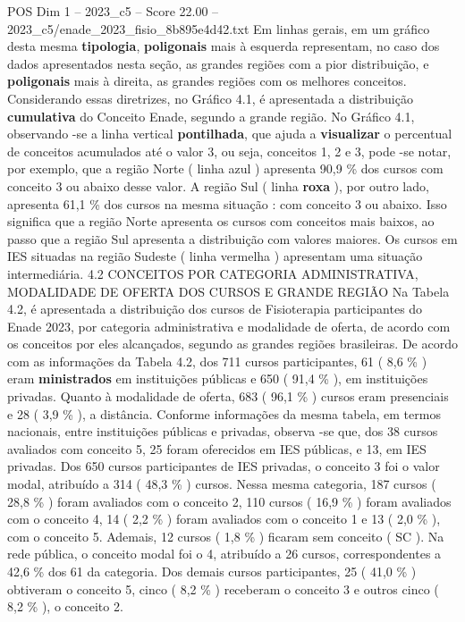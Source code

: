 \begin{textsample}{POS Dim 1 – 2023\_c5 – Score 22.00 – 2023\_c5/enade\_2023\_fisio\_8b895e4d42.txt}
Em linhas gerais, em um gráfico desta mesma \textbf{tipologia}, \textbf{poligonais} mais à esquerda representam, no caso dos dados apresentados nesta seção, as grandes regiões com a pior distribuição, e \textbf{poligonais} mais à direita, as grandes regiões com os melhores conceitos.
Considerando essas diretrizes, no Gráfico 4.1, é apresentada a distribuição \textbf{cumulativa} do Conceito Enade, segundo a grande região.
No Gráfico 4.1, observando -se a linha vertical \textbf{pontilhada}, que ajuda a \textbf{visualizar} o percentual de conceitos acumulados até o valor 3, ou seja, conceitos 1, 2 e 3, pode -se notar, por exemplo, que a região Norte ( linha azul ) apresenta 90,9 \% dos cursos com conceito 3 ou abaixo desse valor.
A região Sul ( linha \textbf{roxa} ), por outro lado, apresenta 61,1 \% dos cursos na mesma situação : com conceito 3 ou abaixo.
Isso significa que a região Norte apresenta os cursos com conceitos mais baixos, ao passo que a região Sul apresenta a distribuição com valores maiores.
Os cursos em IES situadas na região Sudeste ( linha vermelha ) apresentam uma situação intermediária. 4.2 CONCEITOS POR CATEGORIA ADMINISTRATIVA, MODALIDADE DE OFERTA DOS CURSOS E GRANDE REGIÃO Na Tabela 4.2, é apresentada a distribuição dos cursos de Fisioterapia participantes do Enade 2023, por categoria administrativa e modalidade de oferta, de acordo com os conceitos por eles alcançados, segundo as grandes regiões brasileiras.
De acordo com as informações da Tabela 4.2, dos 711 cursos participantes, 61 ( 8,6 \% ) eram \textbf{ministrados} em instituições públicas e 650 ( 91,4 \% ), em instituições privadas.
Quanto à modalidade de oferta, 683 ( 96,1 \% ) cursos eram presenciais e 28 ( 3,9 \% ), a distância.
Conforme informações da mesma tabela, em termos nacionais, entre instituições públicas e privadas, observa -se que, dos 38 cursos avaliados com conceito 5, 25 foram oferecidos em IES públicas, e 13, em IES privadas.
Dos 650 cursos participantes de IES privadas, o conceito 3 foi o valor modal, atribuído a 314 ( 48,3 \% ) cursos.
Nessa mesma categoria, 187 cursos ( 28,8 \% ) foram avaliados com o conceito 2, 110 cursos ( 16,9 \% ) foram avaliados com o conceito 4, 14 ( 2,2 \% ) foram avaliados com o conceito 1 e 13 ( 2,0 \% ), com o conceito 5.
Ademais, 12 cursos ( 1,8 \% ) ficaram sem conceito ( SC ).
Na rede pública, o conceito modal foi o 4, atribuído a 26 cursos, correspondentes a 42,6 \% dos 61 da categoria.
Dos demais cursos participantes, 25 ( 41,0 \% ) obtiveram o conceito 5, cinco ( 8,2 \% ) receberam o conceito 3 e outros cinco ( 8,2 \% ), o conceito 2.

\end{textsample}
